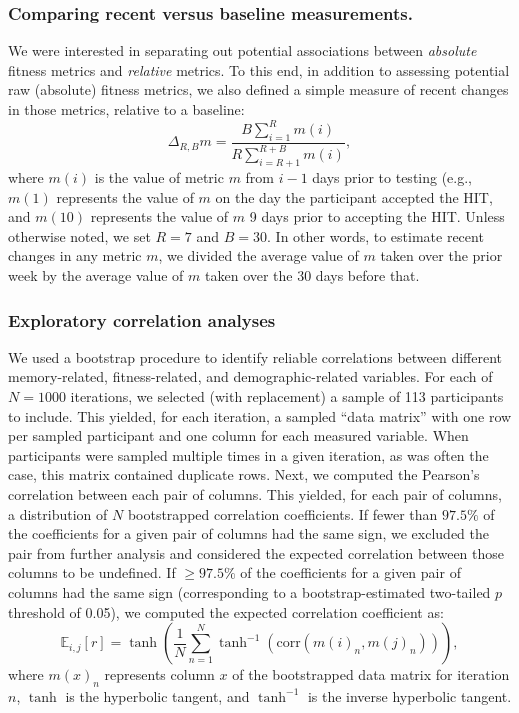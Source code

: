 \documentclass[10pt]{article}
\begin{document}
\subsubsection*{Comparing recent versus baseline measurements.}
We were interested in separating out potential associations between
\textit{absolute} fitness metrics and \textit{relative} metrics.  To
this end, in addition to assessing potential raw (absolute) fitness
metrics, we also defined a simple measure of recent changes in those
metrics, relative to a baseline:
\[
  \Delta_{R, B} m = \frac{B \sum_{i = 1}^R
  m(i)}{R \sum_{i=R + 1}^{R+B}m(i)},
\]
where $m(i)$ is the value of metric $m$ from $i - 1$ days prior to
testing (e.g., $m(1)$ represents the value of $m$ on the day the
participant accepted the HIT, and $m(10)$ represents the value of $m$
9 days prior to accepting the HIT.  Unless otherwise noted, we set
$R = 7$ and $B = 30$.  In other words, to estimate recent changes in
any metric $m$, we divided the average value of $m$ taken over the
prior week by the average value of $m$ taken over the 30 days before
that.


\subsubsection*{Exploratory correlation analyses}
We used a bootstrap procedure to identify reliable correlations
between different memory-related, fitness-related, and
demographic-related variables.  For each of $N = 1000$ iterations, we
selected (with replacement) a sample of 113 participants to include.
This yielded, for each iteration, a sampled ``data matrix'' with one
row per sampled participant and one column for each measured variable.
When participants were sampled multiple times in a given iteration, as
was often the case, this matrix contained duplicate rows.  Next, we computed the Pearson's correlation
between each pair of columns.  This yielded, for each pair of columns,
a distribution of $N$ bootstrapped correlation coefficients.  If fewer
than $97.5\%$ of the coefficients for a given pair of columns had the
same sign, we excluded the pair from further analysis and considered
the expected correlation between those columns to be undefined.  If
$\geq 97.5\%$ of the coefficients for a given pair of columns had the
same sign (corresponding to a bootstrap-estimated two-tailed $p$
threshold of 0.05), we computed the expected correlation coefficient as:
\[
  \mathbb{E}_{i, j}\left[ r\right] = \tanh\left(\frac{1}{N} \sum_{n=1}^N
  \tanh^{-1}(\mathrm{corr}\left(m(i)_n, m(j)_n\right))\right),
\]
where $m(x)_n$ represents column $x$ of the bootstrapped data matrix
for iteration $n$, $\tanh$ is the hyperbolic tangent, and $\tanh^{-1}$
is the inverse hyperbolic tangent.
\end{document}
